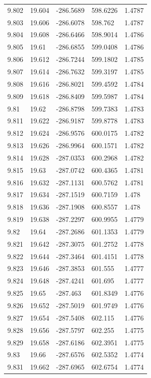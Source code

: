 \begin{tabular}{lllll}
9.802 & 19.604 & -286.5689 & 598.6226 & 1.4787 \\
9.803 & 19.606 & -286.6078 & 598.762 & 1.4787 \\
9.804 & 19.608 & -286.6466 & 598.9014 & 1.4786 \\
9.805 & 19.61 & -286.6855 & 599.0408 & 1.4786 \\
9.806 & 19.612 & -286.7244 & 599.1802 & 1.4785 \\
9.807 & 19.614 & -286.7632 & 599.3197 & 1.4785 \\
9.808 & 19.616 & -286.8021 & 599.4592 & 1.4784 \\
9.809 & 19.618 & -286.8409 & 599.5987 & 1.4784 \\
9.81 & 19.62 & -286.8798 & 599.7383 & 1.4783 \\
9.811 & 19.622 & -286.9187 & 599.8778 & 1.4783 \\
9.812 & 19.624 & -286.9576 & 600.0175 & 1.4782 \\
9.813 & 19.626 & -286.9964 & 600.1571 & 1.4782 \\
9.814 & 19.628 & -287.0353 & 600.2968 & 1.4782 \\
9.815 & 19.63 & -287.0742 & 600.4365 & 1.4781 \\
9.816 & 19.632 & -287.1131 & 600.5762 & 1.4781 \\
9.817 & 19.634 & -287.1519 & 600.7159 & 1.478 \\
9.818 & 19.636 & -287.1908 & 600.8557 & 1.478 \\
9.819 & 19.638 & -287.2297 & 600.9955 & 1.4779 \\
9.82 & 19.64 & -287.2686 & 601.1353 & 1.4779 \\
9.821 & 19.642 & -287.3075 & 601.2752 & 1.4778 \\
9.822 & 19.644 & -287.3464 & 601.4151 & 1.4778 \\
9.823 & 19.646 & -287.3853 & 601.555 & 1.4777 \\
9.824 & 19.648 & -287.4241 & 601.695 & 1.4777 \\
9.825 & 19.65 & -287.463 & 601.8349 & 1.4776 \\
9.826 & 19.652 & -287.5019 & 601.9749 & 1.4776 \\
9.827 & 19.654 & -287.5408 & 602.115 & 1.4776 \\
9.828 & 19.656 & -287.5797 & 602.255 & 1.4775 \\
9.829 & 19.658 & -287.6186 & 602.3951 & 1.4775 \\
9.83 & 19.66 & -287.6576 & 602.5352 & 1.4774 \\
9.831 & 19.662 & -287.6965 & 602.6754 & 1.4774 \\

\end{tabular}
